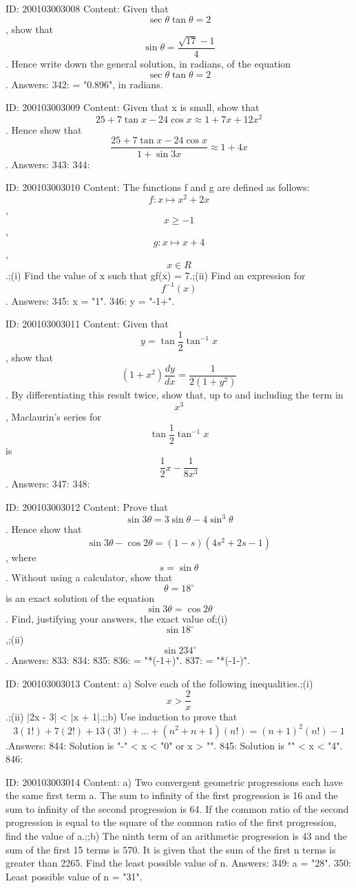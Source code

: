 \documentclass{article}
\begin{document}
ID: 200103003008
Content:
Given that  $$\sec \theta \tan \theta  = 2$$, show that  $$\sin \theta  = \frac{\sqrt{17}  - 1}{4}$$. Hence write down the general solution, in radians, of the equation  $$\sec \theta \tan \theta  = 2$$.  Answers:
342: \theta = "0.896", in radians.

ID: 200103003009
Content:
Given that x is small, show that  $$25 + 7\tan x - 24\cos x \approx 1 + 7x + 12x^2 $$. Hence show that  $$\frac{25 + 7\tan x - 24\cos x}{1 + \sin 3x} \approx 1 + 4x$$.  Answers:
343: 
344: 

ID: 200103003010
Content:
The functions f and g are defined as follows:  $$f:x \mapsto x^2  + 2x$$,  $$x \ge  - 1$$,  $$g:x \mapsto x + 4$$,  $$x \in R$$.;(i) Find the value of x such that gf(x) = 7.;(ii) Find an expression for  $$f^{-1}( x )$$. Answers:
345: x = "1".
346: y = "-1+".

ID: 200103003011
Content:
Given that  $$y = \tan \frac{1}{2} \tan ^{-1} x$$, show that $$(1+x^2)\frac{dy}{dx} = \frac{1}{2(1 + y^2)}$$. By differentiating this result twice, show that, up to and including the term in  $$x^3$$, Maclaurin's series for  $$\tan \frac{1}{2} \tan ^{-1} x$$ is $$\frac{1}{2}x - \frac{1}{8x^3}$$. Answers:
347: 
348: 

ID: 200103003012
Content:
Prove that  $$\sin 3\theta  = 3\sin \theta  - 4\sin ^3 \theta $$. Hence show that  $$\sin 3\theta  - \cos 2\theta  = ( 1 - s )( 4s^2  + 2s - 1 )$$, where  $$s = \sin \theta $$. Without using a calculator, show that  $$\theta  = 18^{\circ} $$ is an exact solution of the equation  $$\sin 3\theta  = \cos 2\theta $$. Find, justifying your answers, the exact value of;(i)  $$\sin 18^{\circ} $$,;(ii)  $$\sin 234^{\circ} $$. Answers:
833: 
834: 
835: 
836:  = "*(-1+)".
837:  = "*(-1-)".

ID: 200103003013
Content:
a) Solve each of the following inequalities.;(i)  $$x > \frac{2}{x}$$.;(ii) |2x - 3| < |x + 1|.;;b) Use induction to prove that  $$3( 1! ) + 7( 2! ) + 13( 3! ) + ... + ( n^2  + n + 1 )( n! ) = ( n + 1 )^2 ( n! ) - 1$$.Answers:
844: Solution is "-" < x < "0" or x > "".
845: Solution is "" < x < "4".
846: 

ID: 200103003014
Content:
a) Two convergent geometric progressions each have the same first term a. The sum to infinity of the first progression is 16 and the sum to infinity of the second progression is 64. If the common ratio of the second   progression is equal to the square of the common ratio of the first progression, find the value of a.;;b) The ninth term of an arithmetic progression is 43 and the sum of the first 15 terms is 570. It is given that the sum of the first n terms is greater than 2265. Find the least possible value of n. Answers:
349: a = "28".
350: Least possible value of n = "31".
\end{document}
